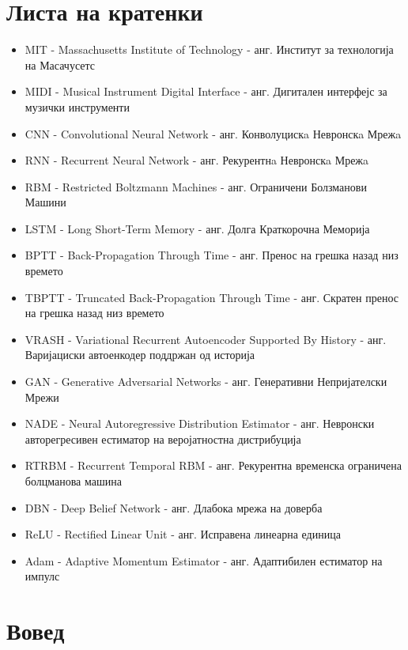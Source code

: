 \chapter*{Листа на кратенки}

\begin{itemize}
    \item MIT - Massachusetts Institute of Technology - анг. Институт за технологија на Масачусетс
    \item MIDI - Musical Instrument Digital Interface - анг. Дигитален интерфејс за музички инструменти
    \item CNN - Convolutional Neural Network - анг. Конволуцискa Невронскa Мрежa
    \item RNN - Recurrent Neural Network - анг. Рекурентнa Невронскa Мрежa
    \item RBM - Restricted Boltzmann Machines - анг. Ограничени Болзманови Машини
    \item LSTM - Long Short-Term Memory - анг. Долга Краткорочна Меморија
    \item BPTT - Back-Propagation Through Time - анг. Пренос на грешка назад низ времето
    \item TBPTT - Truncated Back-Propagation Through Time - анг. Скратен пренос на грешка назад низ времето
    \item VRASH - Variational Recurrent Autoencoder Supported By History - анг. Варијациски автоенкодер поддржан од историја
    \item GAN - Generative Adversarial Networks - анг. Генеративни Непријателски Мрежи
    \item NADE - Neural Autoregressive Distribution Estimator - анг. Невронски авторегресивен естиматор на веројатностна дистрибуција
    \item RTRBM - Recurrent Temporal RBM - анг. Рекурентна временска ограничена болцманова машина
    \item DBN - Deep Belief Network - анг. Длабока мрежа на доверба
    \item ReLU - Rectified Linear Unit - анг. Исправена линеарна единица 
    \item Adam - Adaptive Momentum Estimator - анг. Адаптибилен естиматор на импулс
\end{itemize}

\newpage

\chapter{Вовед}

